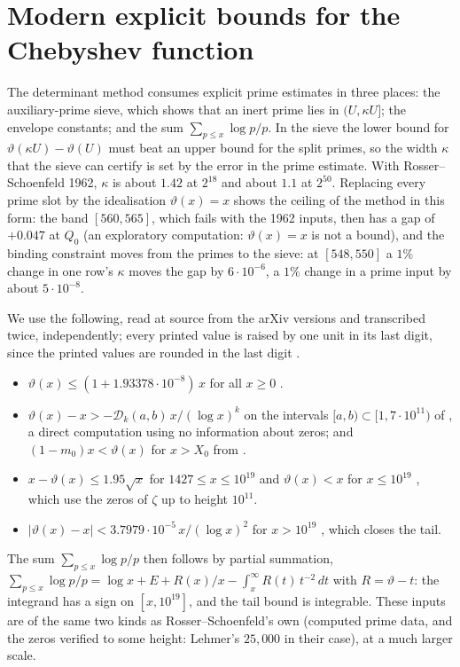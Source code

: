 \documentclass[11pt]{article}
\theoremstyle{definition}
\begin{document}
\section{Modern explicit bounds for the Chebyshev function}\label{sec:modern}
The determinant method consumes explicit prime estimates in three places: the auxiliary-prime sieve, which shows that an inert prime lies in $(U, \kappa U]$; the envelope constants; and the sum $\sum_{p\le x}\log p/p$. In the sieve the lower bound for $\vartheta(\kappa U) - \vartheta(U)$ must beat an upper bound for the split primes, so the width $\kappa$ that the sieve can certify is set by the error in the prime estimate. With Rosser--Schoenfeld 1962, $\kappa$ is about $1.42$ at $2^{18}$ and about $1.1$ at $2^{50}$. Replacing every prime slot by the idealisation $\vartheta(x) = x$ shows the ceiling of the method in this form: the band $[560, 565]$, which fails with the 1962 inputs, then has a gap of $+0.047$ at $Q_0$ (an exploratory computation: $\vartheta(x) = x$ is not a bound), and the binding constraint moves from the primes to the sieve: at $[548, 550]$ a $1\%$ change in one row's $\kappa$ moves the gap by $6\cdot10^{-6}$, a $1\%$ change in a prime input by about $5\cdot10^{-8}$.

We use the following, read at source from the arXiv versions and transcribed twice, independently; every printed value is raised by one unit in its last digit, since the printed values are rounded in the last digit \cite[p.~26]{BKLNW}.
\begin{itemize}[leftmargin=*]
\item $\vartheta(x) \le (1 + 1.93378\cdot10^{-8})\,x$ for all $x \ge 0$ \cite[Cor.~2.1]{BKLNW}.
\item $\vartheta(x) - x > -\mathcal D_k(a,b)\,x/(\log x)^k$ on the intervals $[a,b) \subset [1, 7\cdot10^{11})$ of \cite[Table~13]{BKLNW}, a direct computation using no information about zeros; and $(1-m_0)x < \vartheta(x)$ for $x > X_0$ from \cite[Table~14]{BKLNW}.
\item $x - \vartheta(x) \le 1.95\sqrt x$ for $1427 \le x \le 10^{19}$ and $\vartheta(x) < x$ for $x \le 10^{19}$ \cite[Thm.~2, (1.6)--(1.7)]{Buthe2018}, which use the zeros of $\zeta$ up to height $10^{11}$.
\item $|\vartheta(x) - x| < 3.7979\cdot10^{-5}\,x/(\log x)^2$ for $x > 10^{19}$ \cite[Table~15]{BKLNW}, which closes the tail.
\end{itemize}
The sum $\sum_{p\le x}\log p/p$ then follows by partial summation, $\sum_{p\le x}\log p/p = \log x + E + R(x)/x - \int_x^\infty R(t)\,t^{-2}\,dt$ with $R = \vartheta - t$: the integrand has a sign on $[x, 10^{19}]$, and the tail bound is integrable. These inputs are of the same two kinds as Rosser--Schoenfeld's own (computed prime data, and the zeros verified to some height: Lehmer's $25{,}000$ in their case), at a much larger scale.
\end{document}
